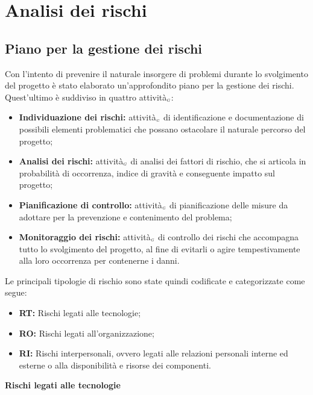 \chapter{Analisi dei rischi}\label{AnalisiDeiRischi}

\section{Piano per la gestione dei rischi}\label{AnalisiDeiRischiPianoPerLaGestioneDeiRischi}
Con l'intento di prevenire il naturale insorgere di problemi durante lo svolgimento del progetto è stato elaborato un'approfondito piano per la gestione dei rischi. Quest'ultimo è suddiviso in quattro attività$_{\scaleto{G}{3pt}}$:
\begin{itemize}
  \item \textbf{Individuazione dei rischi:} attività$_{\scaleto{G}{3pt}}$ di identificazione e documentazione di possibili elementi problematici che possano ostacolare il naturale percorso del progetto;
  \item \textbf{Analisi dei rischi:} attività$_{\scaleto{G}{3pt}}$ di analisi dei fattori di rischio, che si articola in probabilità di occorrenza, indice di gravità e conseguente impatto sul progetto;
  \item \textbf{Pianificazione di controllo:} attività$_{\scaleto{G}{3pt}}$ di pianificazione delle misure da adottare per la prevenzione e contenimento del problema;
  \item \textbf{Monitoraggio dei rischi:} attività$_{\scaleto{G}{3pt}}$ di controllo dei rischi che accompagna tutto lo svolgimento del progetto, al fine di evitarli o agire tempestivamente alla loro occorrenza per contenerne i danni.
\end{itemize}
Le principali tipologie di rischio sono state quindi codificate e categorizzate come segue:
\begin{itemize}
  \item \textbf{RT:} Rischi legati alle tecnologie;
  \item \textbf{RO:} Rischi legati all'organizzazione;
  \item \textbf{RI:} Rischi interpersonali, ovvero legati alle relazioni personali interne ed esterne o alla disponibilità e risorse dei componenti.
\end{itemize}

\quad
\begin{center}
	\LARGE\textbf{Rischi legati alle tecnologie}
\end{center}

